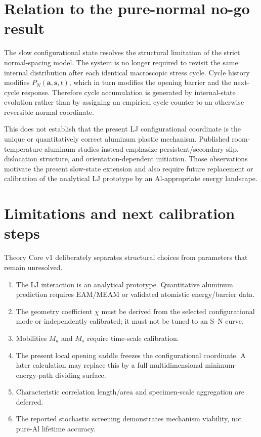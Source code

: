 \documentclass[11pt]{article}
\begin{document}
\section{Relation to the pure-normal no-go result}
The slow configurational state resolves the structural limitation of the strict normal-spacing model. The system is no longer required to revisit the same internal distribution after each identical macroscopic stress cycle. Cycle history modifies $P_N(\bm a,\bm s,t)$, which in turn modifies the opening barrier and the next-cycle response. Therefore cycle accumulation is generated by internal-state evolution rather than by assigning an empirical cycle counter to an otherwise reversible normal coordinate.

This does not establish that the present LJ configurational coordinate is the unique or quantitatively correct aluminum plastic mechanism. Published room-temperature aluminum studies instead emphasize persistent/secondary slip, dislocation structure, and orientation-dependent initiation. Those observations motivate the present slow-state extension and also require future replacement or calibration of the analytical LJ prototype by an Al-appropriate energy landscape.

\section{Limitations and next calibration steps}
Theory Core v1 deliberately separates structural choices from parameters that remain unresolved.
\begin{enumerate}
 \item The LJ interaction is an analytical prototype. Quantitative aluminum prediction requires EAM/MEAM or validated atomistic energy/barrier data.
 \item The geometry coefficient $\chi$ must be derived from the selected configurational mode or independently calibrated; it must not be tuned to an S--N curve.
 \item Mobilities $M_a$ and $M_s$ require time-scale calibration.
 \item The present local opening saddle freezes the configurational coordinate. A later calculation may replace this by a full multidimensional minimum-energy-path dividing surface.
 \item Characteristic correlation length/area and specimen-scale aggregation are deferred.
 \item The reported stochastic screening demonstrates mechanism viability, not pure-Al lifetime accuracy.
\end{enumerate}
\end{document}
